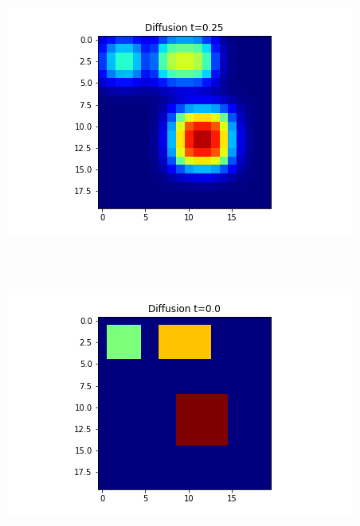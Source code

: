 \documentclass[10pt,a4paper]{article}
\theoremstyle{plain}
\theoremstyle{definition}
\begin{document}
\begin{figure}[!h]
\begin{subfigure}[b]{0.25\textwidth}
    			\caption{}
    			\label{nolongrange3}
    		\end{subfigure}~
    		\begin{subfigure}[b]{0.25\textwidth}
    			\includegraphics[width= \textwidth]{images/nolongrange-t5.png}
    			\caption{}
    			\label{nolongranget5}
    		\end{subfigure}\\
    	\begin{subfigure}[b]{0.25\textwidth}
    		\includegraphics[width= \textwidth]{images/laplace-x3-t0.png}
    		\caption{}
    		\label{laplacet0}
    	\end{subfigure}~
    	\begin{subfigure}[b]{0.25\textwidth}

\end{subfigure}
\end{figure}
\end{document}
